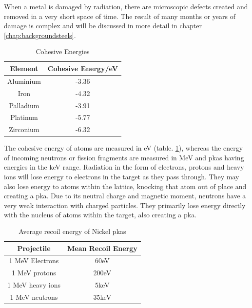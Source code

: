 When a metal is damaged by radiation, there are microscopic defects created and removed in a very short space of time.  The result of many months or years of damage is complex and will be discussed in more detail in chapter \ref{chap:backgroundsteels}.

\begin{table}[h]
\begin{center}
\renewcommand{\arraystretch}{1.2}
\begin{tabular}{c c}
\hline\hline
Element & Cohesive Energy/eV \\
\hline\hline
Aluminium & -3.36 \\
Iron & -4.32 \\
Palladium & -3.91 \\
Platinum & -5.77 \\
Zirconium & -6.32 \\
\hline\hline
\end{tabular}
\end{center}
\caption{Cohesive Energies \cite{shengeamonline}}
\label{table:cohesiveexamples}
\end{table}

The cohesive energy of atoms are measured in eV (table. \ref{table:cohesiveexamples}), whereas the energy of incoming neutrons or fission fragments are measured in MeV and \acrshort{pka}s having energies in the keV range.  Radiation in the form of electrons, protons and heavy ions will lose energy to electrons in the target as they pass through.  They may also lose energy to atoms within the lattice, knocking that atom out of place and creating a \acrshort{pka}.  Due to its neutral charge and magnetic moment, neutrons have a very weak interaction with charged particles.  They primarily lose energy directly with the nucleus of atoms within the target, also creating a \acrshort{pka}.

\begin{table}[h]
\begin{center}
\renewcommand{\arraystretch}{1.2}
\begin{tabular}{c c}
\hline\hline
Projectile & Mean Recoil Energy \\
\hline\hline
1 MeV Electrons & 60eV \\
1 MeV protons & 200eV \\
1 MeV heavy ions & 5keV \\
1 MeV neutrons & 35keV \\
\hline\hline
\end{tabular}
\end{center}
\caption{Average recoil energy of Nickel \acrshort{pka}s\cite{gswas}}
\end{table}


